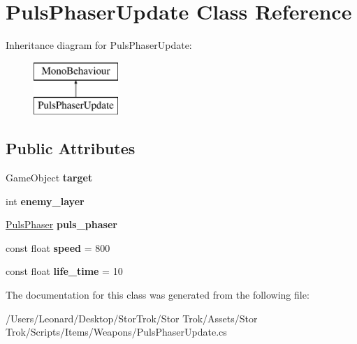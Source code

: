 \hypertarget{class_puls_phaser_update}{}\section{Puls\+Phaser\+Update Class Reference}
\label{class_puls_phaser_update}
Inheritance diagram for Puls\+Phaser\+Update\+:\begin{figure}[H]
\begin{center}
\leavevmode
\includegraphics[height=2.000000cm]{class_puls_phaser_update}
\end{center}
\end{figure}
\subsection*{Public Attributes}
\begin{DoxyCompactItemize}
\item 
\mbox{\label{class_puls_phaser_update_aa5f113fb36900f4914ca0ac6ec623571}} 
Game\+Object {\bfseries target}
\item 
\mbox{\label{class_puls_phaser_update_a1314b5312eba2c77d6376c59d0123b66}} 
int {\bfseries enemy\+\_\+layer}
\item 
\mbox{\label{class_puls_phaser_update_a5daed4a568c876f048c2297a092a1ece}} 
\hyperlink{class_puls_phaser}{Puls\+Phaser} {\bfseries puls\+\_\+phaser}
\item 
\mbox{\label{class_puls_phaser_update_a6d695a148326c176797af6d40badb9e3}} 
const float {\bfseries speed} = 800
\item 
\mbox{\label{class_puls_phaser_update_a29163d6cf8dedf7395551f8f1d764ff8}} 
const float {\bfseries life\+\_\+time} = 10
\end{DoxyCompactItemize}


The documentation for this class was generated from the following file\+:\begin{DoxyCompactItemize}
\item 
/\+Users/\+Leonard/\+Desktop/\+Stor\+Trok/\+Stor Trok/\+Assets/\+Stor Trok/\+Scripts/\+Items/\+Weapons/Puls\+Phaser\+Update.\+cs\end{DoxyCompactItemize}

